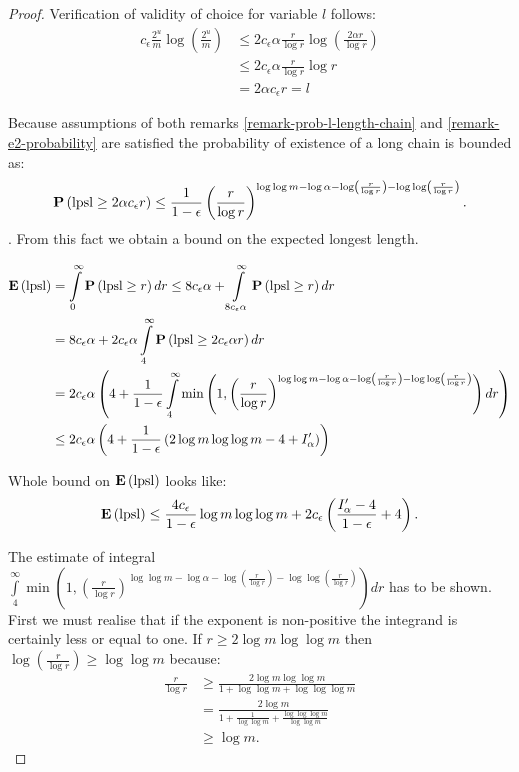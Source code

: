 \begin{proof}
Verification of validity of choice for variable $l$ follows:
\[
\begin{split}
c_\epsilon \frac{2 ^ u}{m} \log \left( \frac{2 ^ u}{m} \right) 
	& \leq 2 c_\epsilon \alpha \frac{r}{\log r} \log \left( \frac{2 \alpha r}{\log r} \right) \\
	& \leq 2 c_\epsilon \alpha \frac{r}{\log r} \log r \\
	& = 2 \alpha c_\epsilon r = l
\end{split}
\]

Because assumptions of both remarks \ref{remark-prob-l-length-chain} and \ref{remark-e2-probability} are satisfied the probability of existence of a long chain is bounded as: \[ \mathbf{P}\left(\mathrm{lpsl} \geq 2 \alpha c_\epsilon r\right) \leq \frac{1}{1 - \epsilon} \left(\frac{r}{\log r}\right)^{\log \log m - \log \alpha - \log \left(\frac{r}{\log r}\right) - \log \log \left(\frac{r}{\log r}\right)} \text{.}\]. From this fact we obtain a bound on the expected longest length.

\[
\begin{split}
\mathbf{E}\left(\mathrm{lpsl}\right)
	& = \int\limits_0^\infty \mathbf{P}\left(\mathrm{lpsl} \geq r\right) dr \leq 8 c_\epsilon \alpha + \int\limits_{8 c_\epsilon \alpha}^\infty \mathbf{P}\left(\mathrm{lpsl} \geq r\right) dr \\ 
	& = 8c_\epsilon \alpha + 2 c_\epsilon \alpha \int\limits_{4}^\infty \mathbf{P}\left(\mathrm{lpsl} \geq 2c_\epsilon \alpha r\right) dr \\
	& = 2c_\epsilon \alpha \left(4 + \frac{1}{1 - \epsilon} \int\limits_{4}^\infty \min\left(1, \left(\frac{r}{\log r}\right)^{\log \log m - \log \alpha - \log \left(\frac{r}{\log r}\right) - \log \log \left(\frac{r}{\log r}\right)}\right) dr \right) \\ 
	& \leq 2c_\epsilon \alpha \left( 4 + \frac{1}{1-\epsilon}\left( 2 \log m \log \log m - 4 + I'_\alpha \right) \right) \\
\end{split}
\]

Whole bound on $\mathbf{E}\left(\mathrm{lpsl}\right)$ looks like:
\[
\mathbf{E}\left(\mathrm{lpsl}\right) \leq \frac{4c_\epsilon}{1 - \epsilon} \log m \log \log m + 2 c_\epsilon \left( \frac{I'_\alpha - 4}{1 - \epsilon} + 4 \right) \text{.}
\]

The estimate of integral $\int\limits_{4}^\infty \min \left(1, \left(\frac{r}{\log r}\right)^{\log \log m - \log \alpha - \log \left(\frac{r}{\log r}\right) - \log \log \left(\frac{r}{\log r}\right)}\right) dr$ has to be shown. First we must realise that if the exponent is non-positive the integrand is certainly less or equal to one. If $r \geq 2 \log m \log \log m$ then $\log \left( \frac{r}{\log r} \right) \geq \log \log m$ because:
\[
\begin{split}
\frac{r}{\log r} 
	& \geq \frac{2 \log m \log \log m}{1 + \log \log m + \log \log \log m} \\
	& = \frac{2 \log m}{1 + \frac{1}{\log \log m} + \frac{\log \log \log m}{\log \log m}} \\
	& \geq \log m \text{.}
\end{split}
\]


\end{proof}
